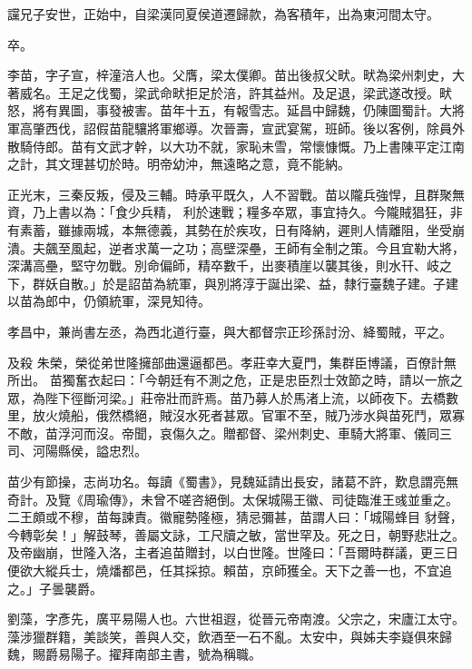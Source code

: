 \begin{pinyinscope}
 讜兄子安世，正始中，自梁漢同夏侯道遷歸款，為客積年，出為東河間太守。



 卒。



 李苗，字子宣，梓潼涪人也。父膺，梁太僕卿。苗出後叔父畎。畎為梁州刺史，大著威名。王足之伐蜀，梁武命畎拒足於涪，許其益州。及足退，梁武遂改授。畎怒，將有異圖，事發被害。苗年十五，有報雪志。延昌中歸魏，仍陳圖蜀計。大將軍高肇西伐，詔假苗龍驤將軍鄉導。次晉壽，宣武宴駕，班師。後以客例，除員外散騎侍郎。苗有文武才幹，以大功不就，家恥未雪，常懷慷慨。乃上書陳平定江南之計，其文理甚切於時。明帝幼沖，無遠略之意，竟不能納。



 正光末，三秦反叛，侵及三輔。時承平既久，人不習戰。苗以隴兵強悍，且群聚無資，乃上書以為：「食少兵精，
 利於速戰；糧多卒眾，事宜持久。今隴賊猖狂，非有素蓄，雖據兩城，本無德義，其勢在於疾攻，日有降納，遲則人情離阻，坐受崩潰。夫飆至風起，逆者求萬一之功；高壁深壘，王師有全制之策。今且宜勒大將，深溝高壘，堅守勿戰。別命偏師，精卒數千，出麥積崖以襲其後，則水幵、岐之下，群妖自散。」於是詔苗為統軍，與別將淳于誕出梁、益，隸行臺魏子建。子建以苗為郎中，仍領統軍，深見知待。



 孝昌中，兼尚書左丞，為西北道行臺，與大都督宗正珍孫討汾、絳蜀賊，平之。


及殺
 朱榮，榮從弟世隆擁部曲還逼都邑。孝莊幸大夏門，集群臣博議，百僚計無所出。
 苗獨奮衣起曰：「今朝廷有不測之危，正是忠臣烈士效節之時，請以一旅之眾，為陛下徑斷河梁。」莊帝壯而許焉。苗乃募人於馬渚上流，以師夜下。去橋數里，放火燒船，俄然橋絕，賊沒水死者甚眾。官軍不至，賊乃涉水與苗死鬥，眾寡不敵，苗浮河而沒。帝聞，哀傷久之。贈都督、梁州刺史、車騎大將軍、儀同三司、河陽縣侯，謚忠烈。



 苗少有節操，志尚功名。每讀《蜀書》，見魏延請出長安，諸葛不許，歎息謂亮無奇計。及覽《周瑜傳》，未曾不嗟咨絕倒。太保城陽王徽、司徒臨淮王彧並重之。二王頗或不穆，苗每諫責。徽寵勢隆極，猜忌彌甚，苗謂人曰：「城陽蜂目
 豺聲，今轉彰矣！」解鼓琴，善屬文詠，工尺牘之敏，當世罕及。死之日，朝野悲壯之。及帝幽崩，世隆入洛，主者追苗贈封，以白世隆。世隆曰：「吾爾時群議，更三日便欲大縱兵士，燒燔都邑，任其採掠。賴苗，京師獲全。天下之善一也，不宜追之。」子曇襲爵。



 劉藻，字彥先，廣平易陽人也。六世祖遐，從晉元帝南渡。父宗之，宋廬江太守。藻涉獵群籍，美談笑，善與人交，飲酒至一石不亂。太安中，與姊夫李嶷俱來歸魏，賜爵易陽子。擢拜南部主書，號為稱職。




\end{pinyinscope}

